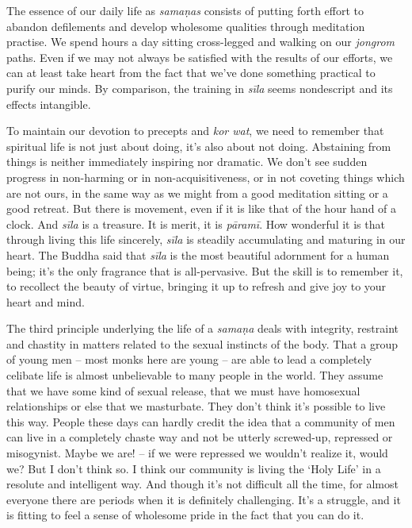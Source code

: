 The essence of our daily life as \emph{samaṇas} consists of putting
forth effort to abandon defilements and develop wholesome qualities
through meditation practise. We spend hours a day sitting cross-legged
and walking on our \emph{jongrom} paths. Even if we may not always be
satisfied with the results of our efforts, we can at least take heart
from the fact that we've done something practical to purify our minds. 
By comparison, the training in \emph{sīla} seems nondescript and its
effects intangible. 

To maintain our devotion to precepts and \emph{kor wat}, we need to
remember that spiritual life is not just about doing, it's also about
not doing. Abstaining from things is neither immediately inspiring nor
dramatic. We don't see sudden progress in non-harming or in
non-acquisitiveness, or in not coveting things which are not ours, in
the same way as we might from a good meditation sitting or a good
retreat. But there is movement, even if it is like that of the hour hand
of a clock. And \emph{sīla} is a treasure. It is merit, it is
\emph{pāramī}. How wonderful it is that through living this life
sincerely, \emph{sīla} is steadily accumulating and maturing in our
heart. The Buddha said that \emph{sīla} is the most beautiful adornment
for a human being; it's the only fragrance that is all-pervasive. But
the skill is to remember it, to recollect the beauty of virtue, bringing
it up to refresh and give joy to your heart and mind. 

The third principle underlying the life of a \emph{samaṇa} deals with
integrity, restraint and chastity in matters related to the sexual
instincts of the body. That a group of young men -- most monks here are
young -- are able to lead a completely celibate life is almost
unbelievable to many people in the world. They assume that we have some
kind of sexual release, that we must have homosexual relationships or
else that we masturbate. They don't think it's possible to live this
way. People these days can hardly credit the idea that a community of
men can live in a completely chaste way and not be utterly screwed-up, 
repressed or misogynist. Maybe we are! -- if we were repressed we
wouldn't realize it, would we? But I don't think so. I think our
community is living the `Holy Life' in a resolute and intelligent way. 
And though it's not difficult all the time, for almost everyone there
are periods when it is definitely challenging. It's a struggle, and it
is fitting to feel a sense of wholesome pride in the fact that you can
do it. 

